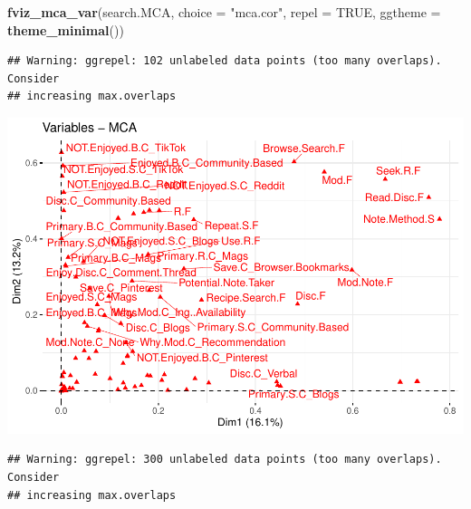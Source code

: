 \documentclass[
]{article}
\newenvironment{Shaded}{\begin{snugshade}}{\end{snugshade}}
\newcommand{\DataTypeTok}[1]{\textcolor[rgb]{0.13,0.29,0.53}{#1}}
\newcommand{\KeywordTok}[1]{\textcolor[rgb]{0.13,0.29,0.53}{\textbf{#1}}}
\newcommand{\NormalTok}[1]{#1}
\newcommand{\OtherTok}[1]{\textcolor[rgb]{0.56,0.35,0.01}{#1}}
\newcommand{\StringTok}[1]{\textcolor[rgb]{0.31,0.60,0.02}{#1}}
\begin{document}
\begin{Shaded}
\begin{Highlighting}[]
\KeywordTok{fviz_mca_var}\NormalTok{(search.MCA, }\DataTypeTok{choice =} \StringTok{"mca.cor"}\NormalTok{, }\DataTypeTok{repel =} \OtherTok{TRUE}\NormalTok{,}
             \DataTypeTok{ggtheme =} \KeywordTok{theme_minimal}\NormalTok{())}
\end{Highlighting}
\end{Shaded}

\begin{verbatim}
## Warning: ggrepel: 102 unlabeled data points (too many overlaps). Consider
## increasing max.overlaps
\end{verbatim}

\includegraphics{Average-User-MCA_files/figure-latex/diet no all-2.pdf}

\begin{Shaded}
\end{Shaded}

\begin{verbatim}
## Warning: ggrepel: 300 unlabeled data points (too many overlaps). Consider
## increasing max.overlaps
\end{verbatim}
\end{document}
